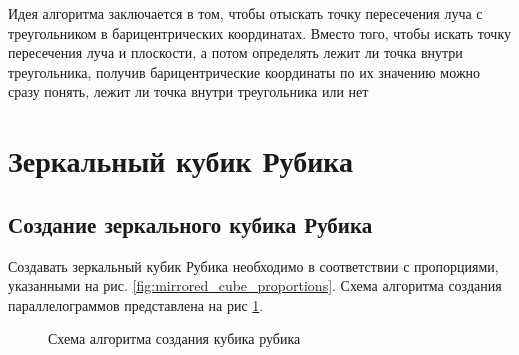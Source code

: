 \documentclass[a4paper, 14pt]{report} %
\begin{document}
	Идея алгоритма заключается в том, чтобы отыскать точку пересечения луча с треугольником в барицентрических координатах. Вместо того, чтобы искать точку пересечения луча и плоскости, а потом определять лежит ли точка внутри треугольника, получив барицентрические координаты по их значению можно сразу понять, лежит ли точка внутри треугольника или нет

	\section{Зеркальный кубик Рубика}
	\subsection{Создание зеркального кубика Рубика}
	Создавать зеркальный кубик Рубика необходимо в соответствии с пропорциями, указанными на рис. \ref{fig:mirrored_cube_proportions}. Схема алгоритма создания параллелограммов представлена на рис \ref{fig:rubicks_create}.
	
	\begin{figure}[!ht]
		\caption{Схема алгоритма создания кубика рубика}
		\label{fig:rubicks_create}
	\end{figure}
\end{document}

